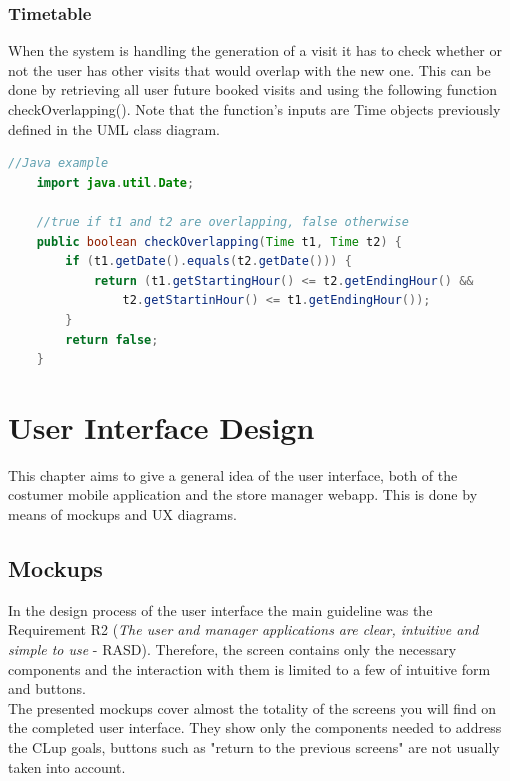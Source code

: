 \documentclass[]{article}
\begin{document}
	\subsubsection{Timetable}
	When the system is handling the generation of a visit it has to check whether or not the user has other visits that would overlap with the new one. \newline
	This can be done by retrieving all user future booked visits and using the following function checkOverlapping(). \newline
	Note that the function's inputs are Time objects previously defined in the UML class diagram. \newline
	
	 \begin{lstlisting}[language=java]
	//Java example
	import java.util.Date;
	
	//true if t1 and t2 are overlapping, false otherwise	
	public boolean checkOverlapping(Time t1, Time t2) {
		if (t1.getDate().equals(t2.getDate())) {
			return (t1.getStartingHour() <= t2.getEndingHour() &&
				t2.getStartinHour() <= t1.getEndingHour());
		} 
		return false;
	}
	\end{lstlisting}
	\newpage
	\section{User Interface Design}
	This chapter aims to give a general idea of the user interface, both of the costumer mobile application and the store manager webapp. 
	This is done by means of mockups and UX diagrams.
		
		\subsection{Mockups}
		In the design process of the user interface the main guideline was the Requirement R2 (\textit{The user and manager applications are clear, intuitive and simple to use} - RASD). Therefore, the screen contains only the necessary components and the interaction with them is limited to a few of intuitive form and buttons.
		\\The presented mockups cover almost the totality of the screens you will find on the completed user interface. They show only the components needed to address the CLup goals, buttons such as "return to the previous screens" are not usually taken into account.
		
\end{document}
